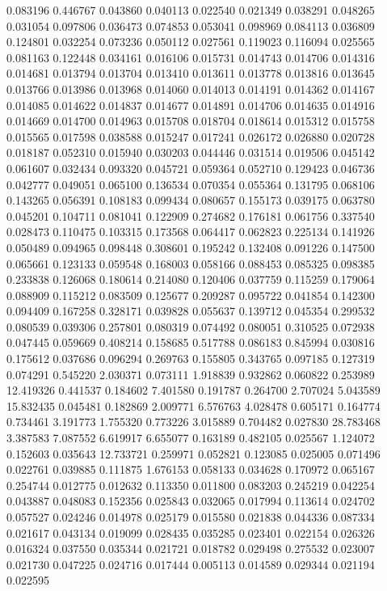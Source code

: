 0.083196
0.446767
0.043860
0.040113
0.022540
0.021349
0.038291
0.048265
0.031054
0.097806
0.036473
0.074853
0.053041
0.098969
0.084113
0.036809
0.124801
0.032254
0.073236
0.050112
0.027561
0.119023
0.116094
0.025565
0.081163
0.122448
0.034161
0.016106
0.015731
0.014743
0.014706
0.014316
0.014681
0.013794
0.013704
0.013410
0.013611
0.013778
0.013816
0.013645
0.013766
0.013986
0.013968
0.014060
0.014013
0.014191
0.014362
0.014167
0.014085
0.014622
0.014837
0.014677
0.014891
0.014706
0.014635
0.014916
0.014669
0.014700
0.014963
0.015708
0.018704
0.018614
0.015312
0.015758
0.015565
0.017598
0.038588
0.015247
0.017241
0.026172
0.026880
0.020728
0.018187
0.052310
0.015940
0.030203
0.044446
0.031514
0.019506
0.045142
0.061607
0.032434
0.093320
0.045721
0.059364
0.052710
0.129423
0.046736
0.042777
0.049051
0.065100
0.136534
0.070354
0.055364
0.131795
0.068106
0.143265
0.056391
0.108183
0.099434
0.080657
0.155173
0.039175
0.063780
0.045201
0.104711
0.081041
0.122909
0.274682
0.176181
0.061756
0.337540
0.028473
0.110475
0.103315
0.173568
0.064417
0.062823
0.225134
0.141926
0.050489
0.094965
0.098448
0.308601
0.195242
0.132408
0.091226
0.147500
0.065661
0.123133
0.059548
0.168003
0.058166
0.088453
0.085325
0.098385
0.233838
0.126068
0.180614
0.214080
0.120406
0.037759
0.115259
0.179064
0.088909
0.115212
0.083509
0.125677
0.209287
0.095722
0.041854
0.142300
0.094409
0.167258
0.328171
0.039828
0.055637
0.139712
0.045354
0.299532
0.080539
0.039306
0.257801
0.080319
0.074492
0.080051
0.310525
0.072938
0.047445
0.059669
0.408214
0.158685
0.517788
0.086183
0.845994
0.030816
0.175612
0.037686
0.096294
0.269763
0.155805
0.343765
0.097185
0.127319
0.074291
0.545220
2.030371
0.073111
1.918839
0.932862
0.060822
0.253989
12.419326
0.441537
0.184602
7.401580
0.191787
0.264700
2.707024
5.043589
15.832435
0.045481
0.182869
2.009771
6.576763
4.028478
0.605171
0.164774
0.734461
3.191773
1.755320
0.773226
3.015889
0.704482
0.027830
28.783468
3.387583
7.087552
6.619917
6.655077
0.163189
0.482105
0.025567
1.124072
0.152603
0.035643
12.733721
0.259971
0.052821
0.123085
0.025005
0.071496
0.022761
0.039885
0.111875
1.676153
0.058133
0.034628
0.170972
0.065167
0.254744
0.012775
0.012632
0.113350
0.011800
0.083203
0.245219
0.042254
0.043887
0.048083
0.152356
0.025843
0.032065
0.017994
0.113614
0.024702
0.057527
0.024246
0.014978
0.025179
0.015580
0.021838
0.044336
0.087334
0.021617
0.043134
0.019099
0.028435
0.035285
0.023401
0.022154
0.026326
0.016324
0.037550
0.035344
0.021721
0.018782
0.029498
0.275532
0.023007
0.021730
0.047225
0.024716
0.017444
0.005113
0.014589
0.029344
0.021194
0.022595
